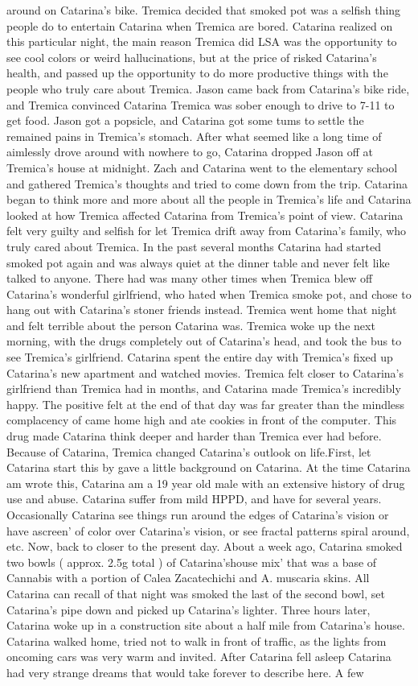 \documentclass[12pt]{book}
\begin{document}
around on Catarina's bike. Tremica decided that smoked pot was a selfish thing people do to entertain Catarina when Tremica are bored. Catarina realized on this particular night, the main reason Tremica did LSA was the opportunity to see cool colors or weird hallucinations, but at the price of risked Catarina's health, and passed up the opportunity to do more productive things with the people who truly care about Tremica. Jason came back from Catarina's bike ride, and Tremica convinced Catarina Tremica was sober enough to drive to 7-11 to get food. Jason got a popsicle, and Catarina got some tums to settle the remained pains in Tremica's stomach. After what seemed like a long time of aimlessly drove around with nowhere to go, Catarina dropped Jason off at Tremica's house at midnight. Zach and Catarina went to the elementary school and gathered Tremica's thoughts and tried to come down from the trip. Catarina began to think more and more about all the people in Tremica's life and Catarina looked at how Tremica affected Catarina from Tremica's point of view. Catarina felt very guilty and selfish for let Tremica drift away from Catarina's family, who truly cared about Tremica. In the past several months Catarina had started smoked pot again and was always quiet at the dinner table and never felt like talked to anyone. There had was many other times when Tremica blew off Catarina's wonderful girlfriend, who hated when Tremica smoke pot, and chose to hang out with Catarina's stoner friends instead. Tremica went home that night and felt terrible about the person Catarina was. Tremica woke up the next morning, with the drugs completely out of Catarina's head, and took the bus to see Tremica's girlfriend. Catarina spent the entire day with Tremica's fixed up Catarina's new apartment and watched movies. Tremica felt closer to Catarina's girlfriend than Tremica had in months, and Catarina made Tremica's incredibly happy. The positive felt at the end of that day was far greater than the mindless complacency of came home high and ate cookies in front of the computer. This drug made Catarina think deeper and harder than Tremica ever had before. Because of Catarina, Tremica changed Catarina's outlook on life.First, let Catarina start this by gave a little background on Catarina. At the time Catarina am wrote this, Catarina am a 19 year old male with an extensive history of drug use and abuse. Catarina suffer from mild HPPD, and have for several years. Occasionally Catarina see things run around the edges of Catarina's vision or have ascreen' of color over Catarina's vision, or see fractal patterns spiral around, etc. Now, back to closer to the present day. About a week ago, Catarina smoked two bowls ( approx. 2.5g total ) of Catarina'shouse mix' that was a base of Cannabis with a portion of Calea Zacatechichi and A. muscaria skins. All Catarina can recall of that night was smoked the last of the second bowl, set Catarina's pipe down and picked up Catarina's lighter. Three hours later, Catarina woke up in a construction site about a half mile from Catarina's house. Catarina walked home, tried not to walk in front of traffic, as the lights from oncoming cars was very warm and invited. After Catarina fell asleep Catarina had very strange dreams that would take forever to describe here. A few 
\end{document}
